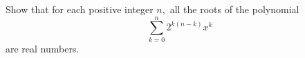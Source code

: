 Show that for each positive integer $n,$ all the roots of the polynomial \[\sum_{k=0}^n 2^{k(n-k)}x^k\] are real numbers.